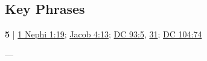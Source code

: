 	
		
		
	
		
		
	
		
		
\subsection{Key Phrases} %
	\label{MANIFEST-PHRASES}

	\begin{compactdesc}
		\item[plainly manifest] \textbf{5} | \hyperref[1NEPHI-1-19]{1 Nephi 1:19}; \hyperref[JACOB-4-13]{Jacob 4:13}; \hyperref[DC93-5]{DC 93:5}, \hyperref[DC93-31]{31}; \hyperref[DC104-74]{DC 104:74}
			\begin{compactdesc}
				\item[Bible anchor verses] ---
			\end{compactdesc}
	\end{compactdesc}
	
